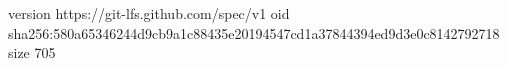 version https://git-lfs.github.com/spec/v1
oid sha256:580a65346244d9cb9a1c88435e20194547cd1a37844394ed9d3e0c8142792718
size 705
